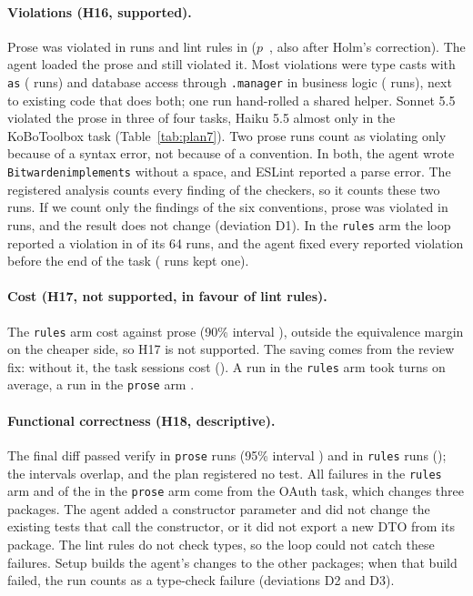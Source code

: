 \documentclass[pdflatex,sn-basic]{sn-jnl}
\newcommand{\arm}[1]{\texttt{#1}}
\begin{document}
\paragraph{Violations (H16, supported).}
Prose was violated in \HSixteenProse{} runs and lint rules in \HSixteenRules{} ($p$~\HSixteenP{}, also after Holm's correction).
The agent loaded the prose and still violated it.
Most violations were type casts with \texttt{as} (\PSevenAsCast{} runs) and database access through \texttt{.manager} in business logic (\PSevenManager{} runs), next to existing code that does both; one run hand-rolled a shared helper.
Sonnet 5.5 violated the prose in three of four tasks, Haiku 5.5 almost only in the KoBoToolbox task (Table~\ref{tab:plan7}).
Two prose runs count as violating only because of a syntax error, not because of a convention.
In both, the agent wrote \texttt{Bitwardenimplements} without a space, and ESLint reported a parse error.
The registered analysis counts every finding of the checkers, so it counts these two runs.
If we count only the findings of the six conventions, prose was violated in \PSevenDOneProse{} runs, and the result does not change (deviation D1).
In the \arm{rules} arm the loop reported a violation in \PSevenLoopRuns{} of its 64 runs, and the agent fixed every reported violation before the end of the task (\PSevenIgnoredRuns{} runs kept one).

\paragraph{Cost (H17, not supported, in favour of lint rules).}
The \arm{rules} arm cost \HSeventeenCost{} against prose (90\% interval \HSeventeenCI), outside the equivalence margin on the cheaper side, so H17 is not supported.
The saving comes from the review fix: without it, the task sessions cost \HSeventeenTaskCost{} (\HSeventeenTaskCI).
A run in the \arm{rules} arm took \PSevenTurnsRules{} turns on average, a run in the \arm{prose} arm \PSevenTurnsProse.

\paragraph{Functional correctness (H18, descriptive).}
The final diff passed verify in \PSevenVerifyProse{} \arm{prose} runs (95\% interval \PSevenVerifyProseCI) and in \PSevenVerifyRules{} \arm{rules} runs (\PSevenVerifyRulesCI); the intervals overlap, and the plan registered no test.
All \PSevenVerifyRulesFail{} failures in the \arm{rules} arm and \PSevenVerifyProseTTwo{} of the \PSevenVerifyProseFail{} in the \arm{prose} arm come from the OAuth task, which changes three packages.
The agent added a constructor parameter and did not change the existing tests that call the constructor, or it did not export a new DTO from its package.
The lint rules do not check types, so the loop could not catch these failures.
Setup builds the agent's changes to the other packages; when that build failed, the run counts as a type-check failure (deviations D2 and D3).
\end{document}

